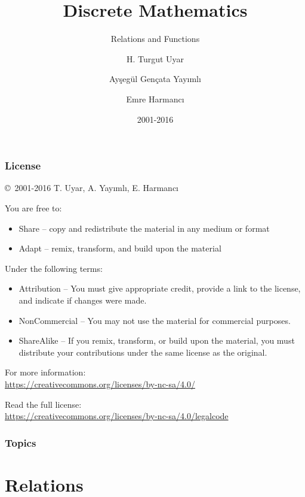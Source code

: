 \documentclass[dvipsnames]{beamer}
\title{Discrete Mathematics}
\subtitle{Relations and Functions}
\author{H. Turgut Uyar \and Ayşegül Gençata Yayımlı \and Emre Harmancı}
\date{2001-2016}
\begin{document}
\begin{frame}
  \titlepage
\end{frame}

\begin{frame}
  \frametitle{License}

  \hfill
  \copyright~2001-2016 T. Uyar, A. Yayımlı, E. Harmancı

  \vfill
  \begin{footnotesize}
    You are free to:
    \begin{itemize}
      \itemsep0em
      \item Share -- copy and redistribute the material in any medium or format
      \item Adapt -- remix, transform, and build upon the material
    \end{itemize}

    Under the following terms:
    \begin{itemize}
      \itemsep0em
      \item Attribution -- You must give appropriate credit, provide a link to
        the license, and indicate if changes were made.

      \item NonCommercial -- You may not use the material for commercial
        purposes.

      \item ShareAlike -- If you remix, transform, or build upon the material,
        you must distribute your contributions under the same license as the
        original.
    \end{itemize}
  \end{footnotesize}

  \begin{small}
    For more information:\\
    \url{https://creativecommons.org/licenses/by-nc-sa/4.0/}

    \smallskip
    Read the full license:\\
    \url{https://creativecommons.org/licenses/by-nc-sa/4.0/legalcode}
  \end{small}
\end{frame}

\begin{frame}
  \frametitle{Topics}
  \tableofcontents
\end{frame}

\section{Relations}
\end{document}
